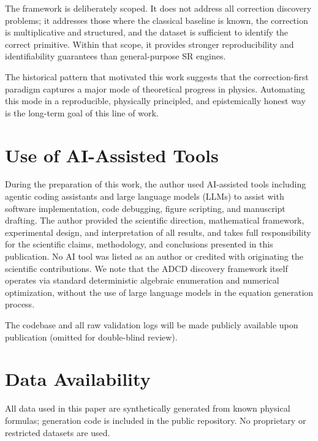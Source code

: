 ﻿\documentclass{article}
\begin{document}
The framework is deliberately scoped.
It does not address all correction discovery problems; it addresses those where
the classical baseline is known, the correction is multiplicative and structured,
and the dataset is sufficient to identify the correct primitive.
Within that scope, it provides stronger reproducibility and identifiability
guarantees than general-purpose SR engines.

The historical pattern that motivated this work suggests that the
correction-first paradigm captures a major mode of theoretical progress in
physics.
Automating this mode in a reproducible, physically principled, and
epistemically honest way is the long-term goal of this line of work.

\section*{Use of AI-Assisted Tools}

During the preparation of this work, the author used AI-assisted tools
including agentic coding assistants and large language models (LLMs) to assist with
software implementation, code debugging, figure scripting, and manuscript drafting.
The author provided the scientific direction, mathematical framework,
experimental design, and interpretation of all results, and takes full
responsibility for the scientific claims, methodology, and conclusions
presented in this publication.
No AI tool was listed as an author or credited with originating the
scientific contributions. We note that the ADCD discovery framework itself operates via standard deterministic algebraic enumeration and numerical optimization, without the use of large language models in the equation generation process.

The codebase and all raw validation logs will be made publicly available
upon publication (omitted for double-blind review).

\section*{Data Availability}

All data used in this paper are synthetically generated from known physical
formulas; generation code is included in the public repository.
No proprietary or restricted datasets are used.





%

\end{document}
